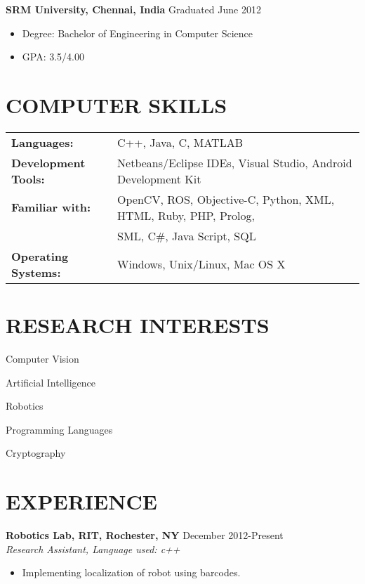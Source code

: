 \documentclass{res}
\begin{document}
\begin{resume}
 {\bf SRM University, Chennai, India \hfill} Graduated June 2012
       \begin{itemize}	
\setlength{\itemsep}{0pt}
        \item[] Degree: Bachelor of Engineering in  Computer Science
        \item[] GPA:  3.5/4.00
\end {itemize}
 
\section{COMPUTER SKILLS} 
\vspace{0.1in}
\begin{tabular}{ll}
{\bf Languages:} & C++, Java, C, MATLAB \\
{\bf Development Tools:} & Netbeans/Eclipse IDEs, Visual Studio, Android Development Kit\\
{\bf Familiar with:} &  OpenCV, ROS, Objective-C, Python, XML, HTML, Ruby, PHP, Prolog, \\ 
&  SML, C\#, Java Script, SQL\\
{\bf Operating Systems:} &  Windows, Unix/Linux, Mac OS X\\

\end{tabular}

\section{RESEARCH INTERESTS} 
\begin{multicols}{3}
\begin{itemize}
\setlength{\itemsep}{0pt}
{\item Computer Vision \item Artificial Intelligence} 
\item Robotics \item Programming Languages  \item Cryptography 
 \end {itemize}
\end{multicols}




\section{EXPERIENCE} 
\vspace{0.1in} 
 {\bf  Robotics Lab, RIT, Rochester, NY    \hfill }December 2012-Present 
\\\emph{ Research Assistant, Language used: c++ } \\
\begin{itemize}
\vspace{-0.15in} 
\item[] Implementing localization of robot using barcodes.
 \end {itemize}


\end{resume}
\end{document}
